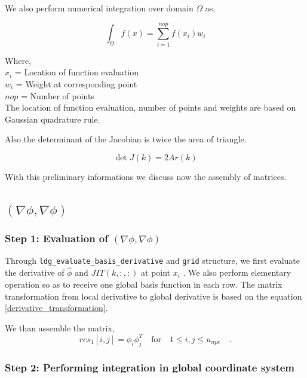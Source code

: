 \documentclass[a4paper]{book}
\begin{document}
We also perform numerical integration over domain $\Omega$ as,

\begin{equation}\label{numerical integration}
\int_{\Omega} f(x) = \sum_{i=1}^{nop} f(x_i) w_i
\end{equation}

Where, \\

$x_i$ = Location of function evaluation\\
$w_i$ = Weight at corresponding point\\
$nop$ = Number of points\\

The location of function evaluation, number of points and weights are based on Gaussian quadrature rule.

Also the determinant of the Jacobian is twice the area of triangle.

\begin{equation}\label{determinant to area}
\det J(k) = 2Ar(k)
\end{equation}

With this preliminary informations we discuss now the assembly of matrices.

\subsection{$(\nabla \phi, \nabla \phi)$}

\subsubsection{Step 1: Evaluation of $(\nabla \phi , \nabla \phi)$}

Through \verb|ldg_evaluate_basis_derivative| and \verb|grid| structure, we first evaluate the derivative of $\hat{\phi}$ and $JIT(k,:,:)$ at point $x_i$ . We also perform elementary operation so as to receive one global basis function in each row. The matrix transformation from local derivative to global derivative is based on the equation \ref{derivative_transformation}.

We than assemble the matrix, 
\begin{equation}
res_1[i,j]=\phi_i \phi_j^T \quad \textrm{for} \quad 1 \leq i,j \leq u_{npe} \quad \textrm{.}
\end{equation}

\subsubsection{Step 2: Performing integration in global coordinate system}
\end{document}
